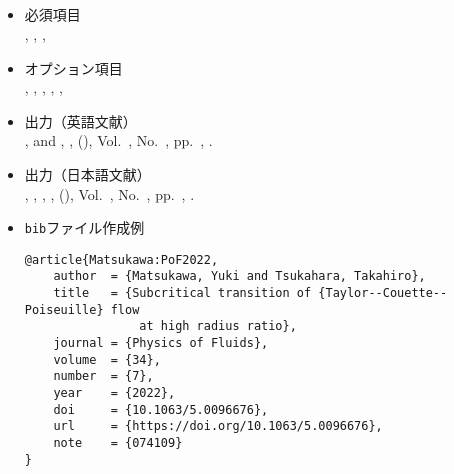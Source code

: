 \documentclass[a4paper,fleqn,uplatex,dvipdfmx]{jsarticle}
\begin{document}
\subsection{\ttarticle}
\label{ssec:article}
\begin{screen}
    \begin{itemize}
        \item 必須項目 \\
        \ttauthor, \tttitle, \ttjournal, \ttyear
        \item オプション項目 \\
        \ttvolume, \ttnumber, \ttpages, \ttmonth, \ttnote, \ttkey
        \item 出力（英語文献） \\
            \colorbox[gray]{0.8}{\ttauthorf}, \colorbox[gray]{0.8}{\ttauthors} and \colorbox[gray]{0.8}{\ttauthort}, \colorbox[gray]{0.8}{\tttitle}, \colorbox[gray]{0.8}{\ttjournal} (\colorbox[gray]{0.8}{\ttyear}), Vol.~\colorbox[gray]{0.8}{\ttvolume}, No.~\colorbox[gray]{0.8}{\ttnumber}, pp.~\colorbox[gray]{0.8}{\ttpages}, \colorbox[gray]{0.8}{\ttnote}.
        \item 出力（日本語文献） \\
            \colorbox[gray]{0.8}{\ttauthorf}, \colorbox[gray]{0.8}{\ttauthors}, \colorbox[gray]{0.8}{\ttauthort}, \colorbox[gray]{0.8}{\tttitle}, \colorbox[gray]{0.8}{\ttjournal} (\colorbox[gray]{0.8}{\ttyear}), Vol.~\colorbox[gray]{0.8}{\ttvolume}, No.~\colorbox[gray]{0.8}{\ttnumber}, pp.~\colorbox[gray]{0.8}{\ttpages}, \colorbox[gray]{0.8}{\ttnote}.
        \item \verb|bib|ファイル作成例 \vspace{-3mm}
\begin{verbatim}
@article{Matsukawa:PoF2022,
    author  = {Matsukawa, Yuki and Tsukahara, Takahiro},
    title   = {Subcritical transition of {Taylor--Couette--Poiseuille} flow 
                at high radius ratio},
    journal = {Physics of Fluids},
    volume  = {34},
    number  = {7},
    year    = {2022},
    doi     = {10.1063/5.0096676},
    url     = {https://doi.org/10.1063/5.0096676},
    note    = {074109}
}
\end{verbatim}
    \end{itemize}
\end{screen}
\end{document}
